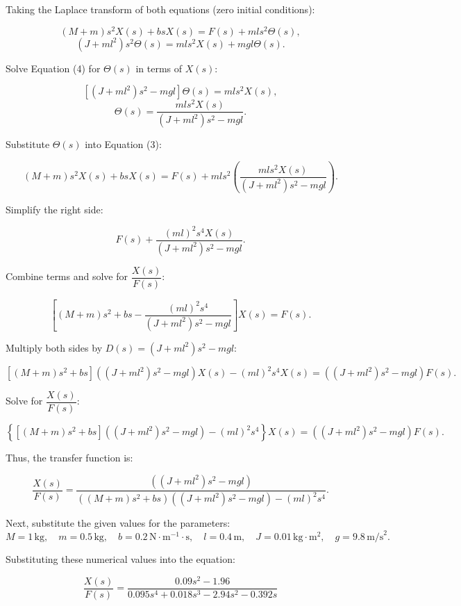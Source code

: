 \documentclass{article}
\begin{document}
Taking the Laplace transform of both equations (zero initial conditions):

\[
(M + m) s^2 X(s) + b s X(s) = F(s) + ml s^2 \Theta(s), \tag{3}
\]
\[
(J + ml^2) s^2 \Theta(s) = ml s^2 X(s) + mgl \Theta(s). \tag{4}
\]

Solve Equation (4) for \( \Theta(s) \) in terms of \( X(s) \):

\[
\left[ (J + ml^2) s^2 - mgl \right] \Theta(s) = ml s^2 X(s),
\]
\[
\Theta(s) = \frac{ml s^2 X(s)}{\left( J + ml^2 \right) s^2 - mgl}. \tag{5}
\]

Substitute \( \Theta(s) \) into Equation (3):

\[
(M + m) s^2 X(s) + b s X(s) = F(s) + ml s^2 \left( \frac{ml s^2 X(s)}{\left( J + ml^2 \right) s^2 - mgl} \right).
\]

Simplify the right side:

\[
F(s) + \frac{(ml)^2 s^4 X(s)}{\left( J + ml^2 \right) s^2 - mgl}.
\]

Combine terms and solve for \( \dfrac{X(s)}{F(s)} \):

\[
\left[ (M + m) s^2 + b s - \frac{(ml)^2 s^4}{(J + ml^2) s^2 - mgl} \right] X(s) = F(s).
\]

Multiply both sides by \( D(s) = (J + ml^2) s^2 - mgl \):

\[
\left[ \left( M + m \right) s^2 + b s \right] ((J + ml^2) s^2 - mgl) X(s) - (ml)^2 s^4 X(s) = ((J + ml^2) s^2 - mgl) F(s).
\]

Solve for \( \dfrac{X(s)}{F(s)} \):

\[
\left\{ \left[ \left( M + m \right) s^2 + b s \right] ((J + ml^2) s^2 - mgl) - (ml)^2 s^4 \right\} X(s) = ((J + ml^2) s^2 - mgl) F(s).
\]

Thus, the transfer function is:

\[
\frac{X(s)}{F(s)} = \frac{((J + ml^2) s^2 - mgl)}{((M + m)s^2 + bs)((J + ml^2) s^2 - mgl) - (ml)^2 s^4}.
\]

Next, substitute the given values for the parameters:
\[
M = 1 \, \text{kg}, \quad m = 0.5 \, \text{kg}, \quad b = 0.2 \, \text{N} \cdot \text{m}^{-1} \cdot \text{s}, \quad l = 0.4 \, \text{m}, \quad J = 0.01 \, \text{kg} \cdot \text{m}^2, \quad g = 9.8 \, \text{m/s}^2.
\]

Substituting these numerical values into the equation:


\[
\boxed{\frac{X(s)}{F(s)} = \frac{0.09 s^2 - 1.96}{0.095 s^4 + 0.018 s^3 - 2.94 s^2 - 0.392 s}}
\]

\newpage
\end{document}
